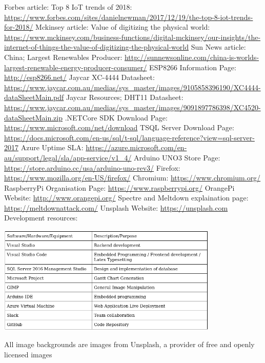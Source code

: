\documentclass{article}
\begin{document}
    \begin{thebibliography}{9}
        \raggedright
            Forbes article: Top 8 IoT trends of 2018:
            \url{https://www.forbes.com/sites/danielnewman/2017/12/19/the-top-8-iot-trends-for-2018/}
            Mckinsey article: Value of digitizing the physical world:
            \url{https://www.mckinsey.com/business-functions/digital-mckinsey/our-insights/the-internet-of-things-the-value-of-digitizing-the-physical-world}
            Sun News article: China; Largest Renewables Producer:
            \url{http://sunnewsonline.com/china-is-worlds-largest-renewable-energy-producer-consumer/}
            ESP8266 Information Page:
            \url{http://esp8266.net/}
            Jaycar XC-4444 Datasheet:
            \url{https://www.jaycar.com.au/medias/sys_master/images/9105858396190/XC4444-dataSheetMain.pdf}
            Jaycar Resources; DHT11 Datasheet:
            \url{https://www.jaycar.com.au/medias/sys_master/images/9091897786398/XC4520-dataSheetMain.zip}
            .NETCore SDK Download Page:
            \url{https://www.microsoft.com/net/download}
            TSQL Server Download Page:
            \url{https://docs.microsoft.com/en-us/sql/t-sql/language-reference?view=sql-server-2017}
            Azure Uptime SLA:
            \url{https://azure.microsoft.com/en-au/support/legal/sla/app-service/v1_4/}
            Arduino UNO3 Store Page:
            \url{https://store.arduino.cc/usa/arduino-uno-rev3/}
            Firefox:
            \url{https://www.mozilla.org/en-US/firefox/}
            Chromium:
            \url{https://www.chromium.org/}
            RaspberryPi Organisation Page:
            \url{https://www.raspberrypi.org/}
            OrangePi Website:
            \url{http://www.orangepi.org/}
            Spectre and Meltdown explaination page:
            \url{https://meltdownattack.com/}
            Unsplash Website:
            \url{https://unsplash.com}
            Development resources:
            \begin{center}
                \includegraphics[width=400px]{Images/DevelopmentResources.jpg}
            \end{center}
    \end{thebibliography}

    All image backgrounds are images from Unsplash, a provider of free and openly
    licensed images\cite{Unsplash}

    
\end{document}
